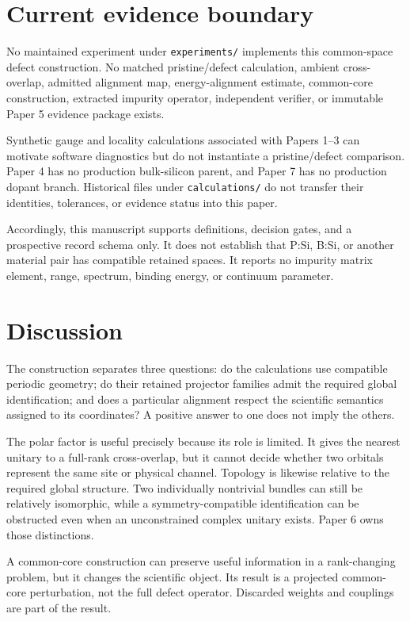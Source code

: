 \documentclass[11pt]{article}
\begin{document}
\section{Current evidence boundary}
No maintained experiment under \texttt{experiments/} implements this common-space defect
construction. No matched pristine/defect calculation, ambient cross-overlap, admitted
alignment map, energy-alignment estimate, common-core construction, extracted impurity
operator, independent verifier, or immutable Paper 5 evidence package exists.

Synthetic gauge and locality calculations associated with Papers 1--3 can motivate
software diagnostics but do not instantiate a pristine/defect comparison. Paper 4 has no
production bulk-silicon parent, and Paper 7 has no production dopant branch. Historical
files under \texttt{calculations/} do not transfer their identities, tolerances, or
evidence status into this paper.

Accordingly, this manuscript supports definitions, decision gates, and a prospective
record schema only. It does not establish that P:Si, B:Si, or another material pair has
compatible retained spaces. It reports no impurity matrix element, range, spectrum,
binding energy, or continuum parameter.

\section{Discussion}
The construction separates three questions: do the calculations use compatible periodic
geometry; do their retained projector families admit the required global identification;
and does a particular alignment respect the scientific semantics assigned to its
coordinates? A positive answer to one does not imply the others.

The polar factor is useful precisely because its role is limited. It gives the nearest
unitary to a full-rank cross-overlap, but it cannot decide whether two orbitals represent
the same site or physical channel. Topology is likewise relative to the required global
structure. Two individually nontrivial bundles can still be relatively isomorphic, while
a symmetry-compatible identification can be obstructed even when an unconstrained
complex unitary exists. Paper 6 owns those distinctions.

A common-core construction can preserve useful information in a rank-changing problem,
but it changes the scientific object. Its result is a projected common-core perturbation,
not the full defect operator. Discarded weights and couplings are part of the result.
\end{document}
